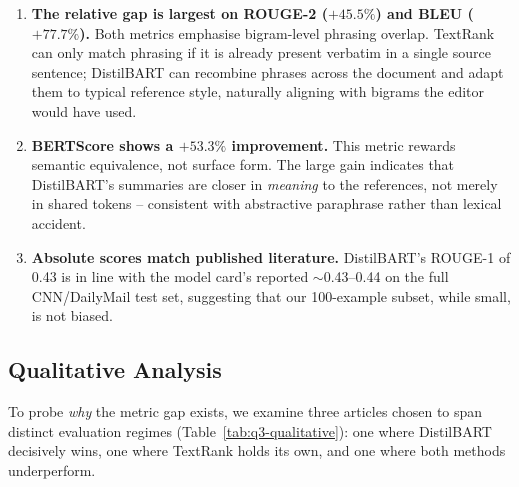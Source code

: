 \documentclass[11pt,a4paper]{article}
\begin{document}
\begin{enumerate}[noitemsep]
    \item \textbf{The relative gap is largest on ROUGE-2 ($+45.5\%$) and
    BLEU ($+77.7\%$).} Both metrics emphasise bigram-level phrasing
    overlap. TextRank can only match phrasing if it is already present
    verbatim in a single source sentence; DistilBART can recombine
    phrases across the document and adapt them to typical reference
    style, naturally aligning with bigrams the editor would have used.
    \item \textbf{BERTScore shows a $+53.3\%$ improvement.} This metric
    rewards semantic equivalence, not surface form. The large gain
    indicates that DistilBART's summaries are closer in \emph{meaning}
    to the references, not merely in shared tokens -- consistent with
    abstractive paraphrase rather than lexical accident.
    \item \textbf{Absolute scores match published literature.}
    DistilBART's ROUGE-1 of 0.43 is in line with the model card's
    reported $\sim$0.43--0.44 on the full CNN/DailyMail test set,
    suggesting that our 100-example subset, while small, is not
    biased.
\end{enumerate}

\subsection{Qualitative Analysis}

To probe \emph{why} the metric gap exists, we examine three articles
chosen to span distinct evaluation regimes
(Table~\ref{tab:q3-qualitative}): one where DistilBART decisively wins,
one where TextRank holds its own, and one where both methods
underperform.
\end{document}
